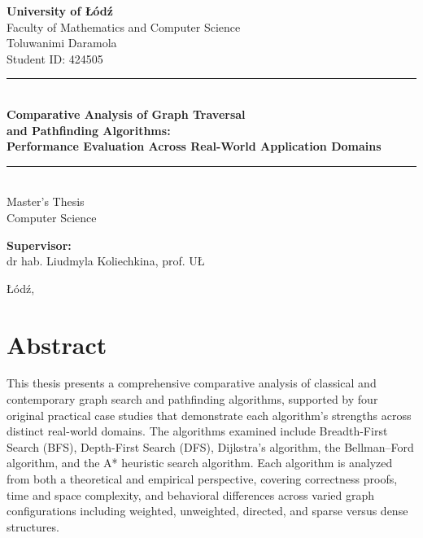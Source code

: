 \documentclass[12pt, a4paper, oneside]{report}
\theoremstyle{definition}
\begin{document}
\graphicspath{
  {images/cs1/}
  {images/cs2/}
  {images/cs3/}
  {images/cs4/}
}

\begin{titlepage}
    \centering
    \vspace*{1cm}
    {\large \textbf{University of Łódź}\\
    Faculty of Mathematics and Computer Science}\\[1.5cm]

    {\large Toluwanimi Daramola}\\[0.5cm]
    {\small Student ID: 424505}\\[2cm]

    \rule{\linewidth}{0.5mm}\\[0.4cm]
    {\LARGE \bfseries Comparative Analysis of Graph Traversal\\[0.3cm]
    and Pathfinding Algorithms:\\[0.3cm]
    Performance Evaluation Across Real-World Application Domains}\\[0.4cm]
    \rule{\linewidth}{0.5mm}\\[1.5cm]

    {\large Master's Thesis\\
    Computer Science}\\[2cm]

    \begin{flushleft}
    \large
    \textbf{Supervisor:}\\
    dr hab. Liudmyla Koliechkina, prof. UŁ\\[1cm]
    \end{flushleft}

    \vfill
    {\large Łódź, \the\year}
\end{titlepage}


\chapter*{Abstract}

This thesis presents a comprehensive comparative analysis of classical and contemporary graph search and pathfinding algorithms, supported by four original practical case studies that demonstrate each algorithm's strengths across distinct real-world domains. The algorithms examined include Breadth-First Search (BFS), Depth-First Search (DFS), Dijkstra's algorithm, the Bellman–Ford algorithm, and the A* heuristic search algorithm. Each algorithm is analyzed from both a theoretical and empirical perspective, covering correctness proofs, time and space complexity, and behavioral differences across varied graph configurations including weighted, unweighted, directed, and sparse versus dense structures.
\end{document}
